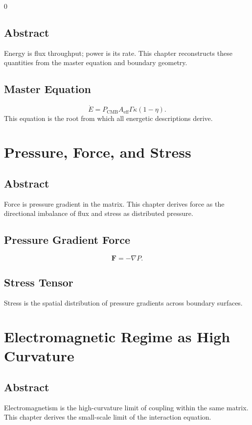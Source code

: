 0\documentclass[12pt]{book}
\begin{document}
\section*{Abstract}
Energy is flux throughput; power is its rate. This chapter reconstructs these quantities from the
master equation and boundary geometry.

\section{Master Equation}
\begin{equation}
\dot{E} = P_{\text{CMB}} A_{\text{eff}} \Gamma \kappa (1-\eta).
\end{equation}
This equation is the root from which all energetic descriptions derive.

\chapter{Pressure, Force, and Stress}

\section*{Abstract}
Force is pressure gradient in the matrix. This chapter derives force as the directional imbalance of
flux and stress as distributed pressure.

\section{Pressure Gradient Force}
\begin{equation}
\mathbf{F} = -\nabla P.
\end{equation}

\section{Stress Tensor}
Stress is the spatial distribution of pressure gradients across boundary surfaces.

\chapter{Electromagnetic Regime as High Curvature}

\section*{Abstract}
Electromagnetism is the high-curvature limit of coupling within the same matrix. This chapter derives
the small-scale limit of the interaction equation.
\end{document}

